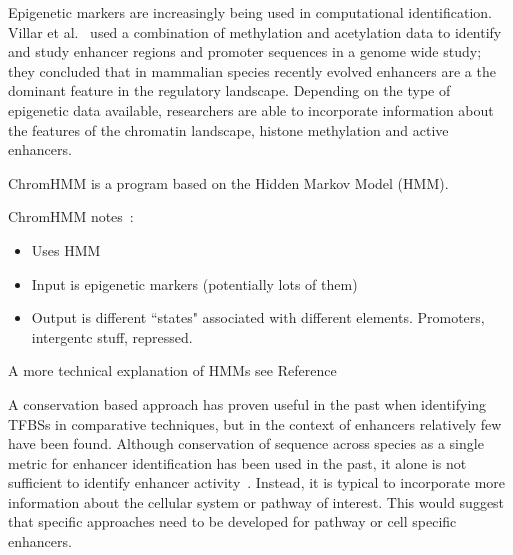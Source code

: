         Epigenetic markers are increasingly being used in computational identification. Villar et al.~\cite{villar2015enhancer} used a combination of methylation and acetylation data to identify and study enhancer regions and promoter sequences in a genome wide study; they concluded that in mammalian species recently evolved enhancers are a the dominant feature in the regulatory landscape. Depending on the type of epigenetic data available, researchers are able to incorporate information about the features of the chromatin landscape, histone methylation and active enhancers. 
        
        
        ChromHMM is a program based on the Hidden Markov Model (HMM). 
        
        ChromHMM notes~\cite{ernst2010discovery}:
            \begin{itemize}
                \item Uses HMM
                \item Input is epigenetic markers (potentially lots of them)
                \item Output is different ``states" associated with different elements. Promoters, intergentc stuff, repressed.
            \end{itemize}
       
       A more technical explanation of HMMs see Reference
        
        
        
        
        
        
        A conservation based approach has proven useful in the past when identifying TFBSs in comparative techniques, but in the context of enhancers relatively few have been found. Although conservation of sequence across species as a single metric for enhancer identification has been used in the past, it alone is not sufficient to identify enhancer activity~\cite{blow2010chip}. Instead, it is typical to incorporate more information about the cellular system or pathway of interest. 
        This would suggest that specific approaches need to be developed for pathway or cell specific enhancers. 

